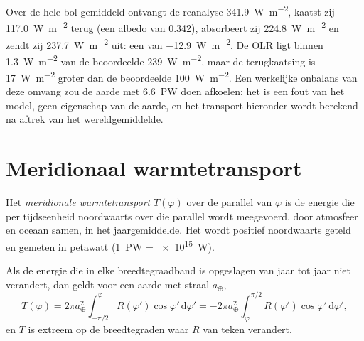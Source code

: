 \begin{example}\label{ex:b1:radiation-heat-transport:global}
Over de hele bol gemiddeld ontvangt de reanalyse \qty{341.9}{W.m^{-2}}, kaatst zij \qty{117.0}{W.m^{-2}} terug (een albedo van \num{0.342}), absorbeert zij \qty{224.8}{W.m^{-2}} en zendt zij \qty{237.7}{W.m^{-2}} uit: een  van \qty{-12.9}{W.m^{-2}}. De OLR ligt binnen \qty{1.3}{W.m^{-2}} van de beoordeelde \qty{239}{W.m^{-2}}, maar de terugkaatsing is \qty{17}{W.m^{-2}} groter dan de beoordeelde \qty{100}{W.m^{-2}}. Een werkelijke onbalans van deze omvang zou de aarde met \qty{6.6}{PW} doen afkoelen; het is een fout van het model, geen eigenschap van de aarde, en het transport hieronder wordt berekend na aftrek van het wereldgemiddelde.
\end{example}

\section{Meridionaal warmtetransport}\label{sec:b1:radiation-heat-transport:transport}

\begin{definition}\label{def:b1:radiation-heat-transport:mht}
Het \emph{meridionale warmtetransport} $T(\varphi)$
over de parallel van  $\varphi$ is de energie die per tijdseenheid noordwaarts over die parallel wordt meegevoerd, door atmosfeer en oceaan samen, in het jaargemiddelde. Het wordt positief noordwaarts geteld en gemeten in petawatt
(\qty{1}{PW} = \qty{e15}{W}).
\end{definition}

\begin{proposition}\label{prop:b1:radiation-heat-transport:mht}
Als de energie die in elke breedtegraadband is opgeslagen van jaar tot jaar niet verandert, dan geldt voor een aarde met straal $a_\oplus$,
\[
  T(\varphi) = 2\pi a_\oplus^2\int_{-\pi/2}^{\varphi} R(\varphi')\cos\varphi'\,
  \mathrm d\varphi' = -2\pi a_\oplus^2\int_{\varphi}^{\pi/2} R(\varphi')\cos
  \varphi'\,\mathrm d\varphi' ,
\]
en $T$ is extreem op de breedtegraden waar $R$ van teken verandert.
\end{proposition}

